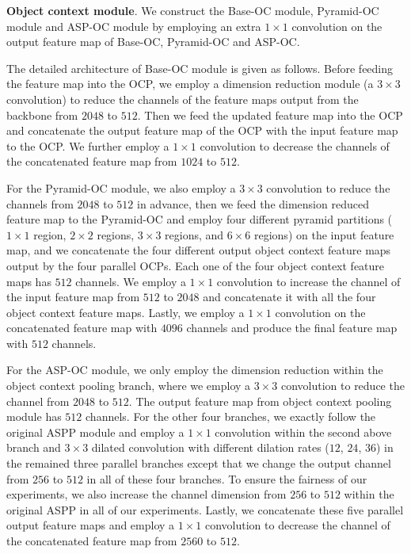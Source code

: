 \documentclass[10pt,twocolumn,letterpaper]{article}
\begin{document}
\vspace{.1cm}
\noindent\textbf{Object context module}.
We construct the Base-OC module, Pyramid-OC module and ASP-OC module
by employing an extra $1 \times 1$ convolution on the output feature map of
Base-OC, Pyramid-OC and ASP-OC.

The detailed architecture of Base-OC module is given as follows.
Before feeding the feature map into the OCP,
we employ a dimension reduction module (a $3 \times 3$ convolution)
to reduce the channels of the feature maps output from the backbone from $2048$ to $512$.
Then we feed the updated feature map into the
OCP and concatenate the output feature map of the OCP with the
input feature map to the OCP.
We further employ a $1 \times 1$ convolution
to decrease the channels of
the concatenated feature map from $1024$ to $512$.


For the Pyramid-OC module, we also employ a $3 \times 3$ convolution to reduce the channels
from $2048$ to $512$ in advance,
then we feed the dimension reduced feature map to the Pyramid-OC and employ four different pyramid partitions ($1\times 1$ region,
$2\times 2$ regions,
$3\times 3$ regions,
and $6 \times 6$ regions) on the
input feature map,
and we concatenate the four different output object context feature maps output
by the four parallel OCPs.
Each one of the four object context feature maps has $512$ channels.
We employ a $1 \times 1$ convolution to increase the channel of the input feature map
from $512$ to $2048$ and concatenate it with all the four object context feature maps.
Lastly, we employ a $1 \times 1$ convolution on the concatenated feature map with $4096$ channels and produce the final feature map with $512$ channels.

For the ASP-OC module, we only employ the dimension reduction within the object context pooling branch, where we employ a $3 \times 3$ convolution to reduce the channel from $2048$ to $512$. The output feature map from object context pooling module has $512$ channels.
For the other four branches, we exactly follow the original ASPP module and employ a $1 \times 1$ convolution within the second above branch and $3 \times 3$ dilated convolution with different dilation rates ($12$, $24$, $36$) in the remained three parallel branches except that we change the output channel from $256$ to $512$ in all of these four branches.
To ensure the fairness of our experiments, we also increase the channel dimension from $256$ to $512$ within the original ASPP in all of our experiments.
Lastly, we concatenate these five parallel output feature maps and employ a $1 \times 1$ convolution
to decrease the channel of the concatenated feature map from $2560$ to $512$.
\end{document}
